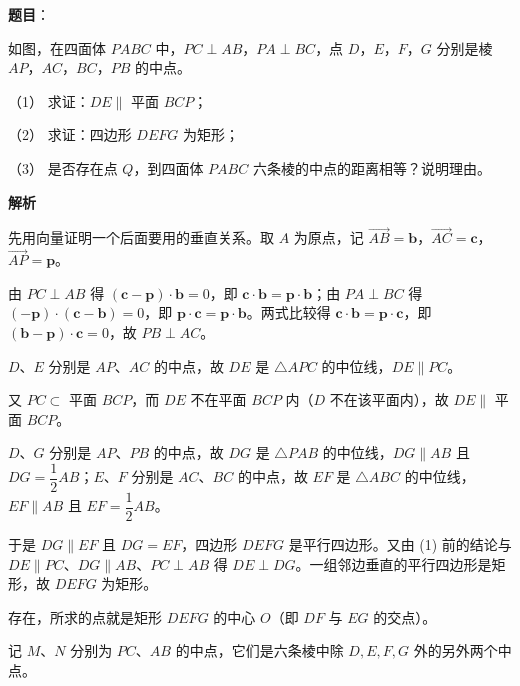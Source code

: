 \begin{answer}

\textbf{题目}：

如图，在四面体 $PABC$ 中，$PC\perp AB$，$PA\perp BC$，点 $D$，$E$，$F$，$G$ 分别是棱 $AP$，$AC$，$BC$，$PB$ 的中点。

（1） 求证：$DE\parallel$ 平面 $BCP$；

（2） 求证：四边形 $DEFG$ 为矩形；

（3） 是否存在点 $Q$，到四面体 $PABC$ 六条棱的中点的距离相等？说明理由。
\nopagebreak[4]
\begin{center}\end{center}
\nopagebreak[4]
\textbf{解析}

先用向量证明一个后面要用的垂直关系。取 $A$ 为原点，记 $\vec{AB}=\boldsymbol b$，$\vec{AC}=\boldsymbol c$，$\vec{AP}=\boldsymbol p$。

由 $PC\perp AB$ 得 $(\boldsymbol c-\boldsymbol p)\cdot\boldsymbol b=0$，即 $\boldsymbol c\cdot\boldsymbol b=\boldsymbol p\cdot\boldsymbol b$；由 $PA\perp BC$ 得 $(-\boldsymbol p)\cdot(\boldsymbol c-\boldsymbol b)=0$，即 $\boldsymbol p\cdot\boldsymbol c=\boldsymbol p\cdot\boldsymbol b$。两式比较得 $\boldsymbol c\cdot\boldsymbol b=\boldsymbol p\cdot\boldsymbol c$，即 $(\boldsymbol b-\boldsymbol p)\cdot\boldsymbol c=0$，故 $PB\perp AC$。


$D$、$E$ 分别是 $AP$、$AC$ 的中点，故 $DE$ 是 $\triangle APC$ 的中位线，$DE\parallel PC$。

又 $PC\subset$ 平面 $BCP$，而 $DE$ 不在平面 $BCP$ 内（$D$ 不在该平面内），故 $DE\parallel$ 平面 $BCP$。


$D$、$G$ 分别是 $AP$、$PB$ 的中点，故 $DG$ 是 $\triangle PAB$ 的中位线，$DG\parallel AB$ 且 $DG=\dfrac12AB$；$E$、$F$ 分别是 $AC$、$BC$ 的中点，故 $EF$ 是 $\triangle ABC$ 的中位线，$EF\parallel AB$ 且 $EF=\dfrac12AB$。

于是 $DG\parallel EF$ 且 $DG=EF$，四边形 $DEFG$ 是平行四边形。又由 (1) 前的结论与 $DE\parallel PC$、$DG\parallel AB$、$PC\perp AB$ 得 $DE\perp DG$。一组邻边垂直的平行四边形是矩形，故 $DEFG$ 为矩形。


存在，所求的点就是矩形 $DEFG$ 的中心 $O$（即 $DF$ 与 $EG$ 的交点）。

记 $M$、$N$ 分别为 $PC$、$AB$ 的中点，它们是六条棱中除 $D,E,F,G$ 外的另外两个中点。


\end{answer}

